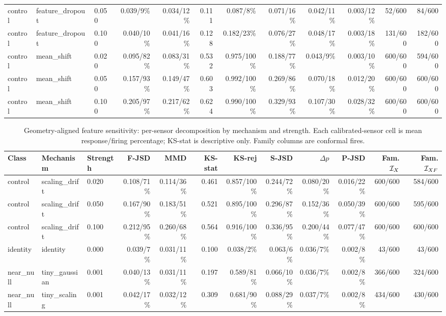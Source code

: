 \begin{table}[!t]
\begin{tabular}{@{}lllrrrrrrrrr@{}}
control & feature\_dropout & 0.050 & 0.039/9\% & 0.034/12\% & 0.111 & 0.087/8\% & 0.071/16\% & 0.042/11\% & 0.003/12\% & 52/600 & 84/600 \\
control & feature\_dropout & 0.100 & 0.040/10\% & 0.041/16\% & 0.128 & 0.182/23\% & 0.076/27\% & 0.048/17\% & 0.003/18\% & 131/600 & 182/600 \\
control & mean\_shift & 0.020 & 0.095/82\% & 0.083/31\% & 0.532 & 0.975/100\% & 0.188/77\% & 0.043/9\% & 0.003/10\% & 600/600 & 594/600 \\
control & mean\_shift & 0.050 & 0.157/93\% & 0.149/47\% & 0.603 & 0.992/100\% & 0.269/86\% & 0.070/18\% & 0.012/20\% & 600/600 & 600/600 \\
control & mean\_shift & 0.100 & 0.205/97\% & 0.217/62\% & 0.624 & 0.990/100\% & 0.329/93\% & 0.107/30\% & 0.028/32\% & 600/600 & 600/600 \\
\bottomrule
\end{tabular}
\end{table}

\begin{table}[!t]
\caption{Geometry-aligned feature sensitivity: per-sensor decomposition by mechanism and strength. Each calibrated-sensor cell is mean response/firing percentage; KS-stat is descriptive only. Family columns are conformal fires.}
\label{tab:v137-decomp-5}
\centering\scriptsize\renewcommand{\arraystretch}{0.94}\setlength{\tabcolsep}{2.1pt}
\begin{tabular}{@{}lllrrrrrrrrr@{}}
\toprule
Class & Mechanism & Strength & F-JSD & MMD & KS-stat & KS-rej & S-JSD & $\Delta p$ & P-JSD & Fam. $\mathcal I_X$ & Fam. $\mathcal I_{XF}$ \\
\midrule
control & scaling\_drift & 0.020 & 0.108/71\% & 0.114/36\% & 0.461 & 0.857/100\% & 0.244/72\% & 0.080/20\% & 0.016/22\% & 600/600 & 584/600 \\
control & scaling\_drift & 0.050 & 0.167/90\% & 0.183/51\% & 0.521 & 0.895/100\% & 0.296/87\% & 0.152/36\% & 0.050/39\% & 600/600 & 595/600 \\
control & scaling\_drift & 0.100 & 0.212/95\% & 0.260/68\% & 0.564 & 0.916/100\% & 0.336/95\% & 0.200/44\% & 0.077/47\% & 600/600 & 600/600 \\
identity & identity & 0.000 & 0.039/7\% & 0.031/11\% & 0.100 & 0.038/2\% & 0.063/6\% & 0.036/7\% & 0.002/8\% & 43/600 & 43/600 \\
near\_null & tiny\_gaussian & 0.001 & 0.040/13\% & 0.031/11\% & 0.197 & 0.589/81\% & 0.066/10\% & 0.036/7\% & 0.002/8\% & 366/600 & 324/600 \\
near\_null & tiny\_scaling & 0.001 & 0.042/17\% & 0.032/12\% & 0.309 & 0.681/90\% & 0.088/29\% & 0.037/7\% & 0.002/8\% & 434/600 & 430/600 \\
\bottomrule
\end{tabular}
\end{table}

